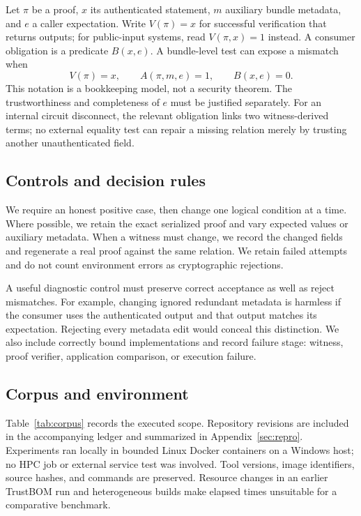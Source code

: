 \documentclass[sigconf,nonacm]{acmart}
\begin{document}
Let $\pi$ be a proof, $x$ its authenticated statement, $m$ auxiliary bundle metadata, and $e$ a caller expectation. Write $V(\pi)=x$ for successful verification that returns outputs; for public-input systems, read $V(\pi,x)=1$ instead. A consumer obligation is a predicate $B(x,e)$. A bundle-level test can expose a mismatch when
\begin{equation}
 V(\pi)=x,\qquad A(\pi,m,e)=1,\qquad B(x,e)=0.
\end{equation}
This notation is a bookkeeping model, not a security theorem. The trustworthiness and completeness of $e$ must be justified separately. For an internal circuit disconnect, the relevant obligation links two witness-derived terms; no external equality test can repair a missing relation merely by trusting another unauthenticated field.

\subsection{Controls and decision rules}
We require an honest positive case, then change one logical condition at a time. Where possible, we retain the exact serialized proof and vary expected values or auxiliary metadata. When a witness must change, we record the changed fields and regenerate a real proof against the same relation. We retain failed attempts and do not count environment errors as cryptographic rejections.

A useful diagnostic control must preserve correct acceptance as well as reject mismatches. For example, changing ignored redundant metadata is harmless if the consumer uses the authenticated output and that output matches its expectation. Rejecting every metadata edit would conceal this distinction. We also include correctly bound implementations and record failure stage: witness, proof verifier, application comparison, or execution failure.

\subsection{Corpus and environment}
Table~\ref{tab:corpus} records the executed scope. Repository revisions are included in the accompanying ledger and summarized in Appendix~\ref{sec:repro}. Experiments ran locally in bounded Linux Docker containers on a Windows host; no HPC job or external service test was involved. Tool versions, image identifiers, source hashes, and commands are preserved. Resource changes in an earlier TrustBOM run and heterogeneous builds make elapsed times unsuitable for a comparative benchmark.
\end{document}
